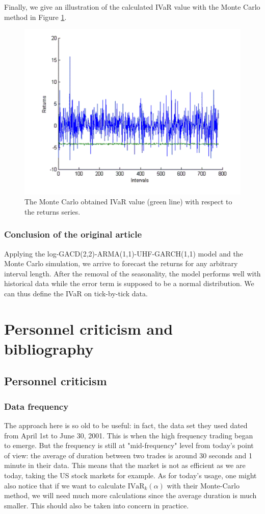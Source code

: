 \documentclass[12pt, a4paper]{article}
\begin{document}
Finally, we give an illustration of the calculated IVaR value with the Monte Carlo method in Figure \ref{fig:IVaR}.

\begin{figure}[htpf!]
    \centering
    \includegraphics[scale=0.3]{Result_IVaR}
    \caption{The Monte Carlo obtained IVaR value (green line) with respect to the returns series.}
    \label{fig:IVaR}
\end{figure}
\subsubsection{Conclusion of the original article}
Applying the log-GACD(2,2)-ARMA(1,1)-UHF-GARCH(1,1) model and the Monte Carlo simulation, we arrive to forecast the returns for any arbitrary interval length. After the removal of the seasonality, the model performs well with historical data while the error term is supposed to be a normal distribution. We can thus define the IVaR on tick-by-tick data.

\section{Personnel criticism and bibliography}
\subsection{Personnel criticism}
\subsubsection{Data frequency}
The approach here is so old to be useful: in fact, the data set they used dated from April 1st to June 30, 2001. This is when the high frequency trading began to emerge. But the frequency is still at "mid-frequency" level from today's point of view: the average of duration between two trades is around 30 seconds and 1 minute in their data. This means that the market is not as efficient as we are today, taking the US stock markets for example. As for today's usage, one might also notice that if we want to calculate $\mbox{IVaR}_k(\alpha)$ with their Monte-Carlo method, we will need much more calculations since the average duration is much smaller. This should also be taken into concern in practice.
\end{document}
